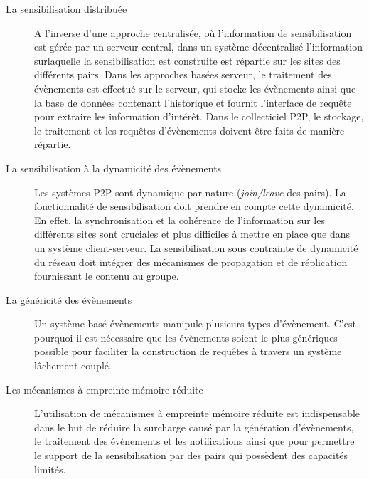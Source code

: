 \begin{description}
	\item[La sensibilisation distribuée] A l'inverse d'une approche centralisée, où 
	l'information de sensibilisation est gérée par un serveur central, dans un 
	système décentralisé l'information surlaquelle la sensibilisation est construite 
	est répartie sur les sites des différents pairs. Dans les approches basées 
	serveur, le traitement des évènements est effectué sur le serveur, qui stocke 
	les évènements ainsi que la base de données contenant l'historique et fournit 
	l'interface de requête pour extraire les information d'intérêt. Dans le collecticiel 
	P2P, le stockage, le traitement et les requêtes d'évènements doivent être faits 
	de manière répartie.
	
	\item[La sensibilisation à la dynamicité des évènements] Les systèmes P2P 
	sont dynamique par nature (\textit{join/leave} des pairs). La fonctionnalité de 
	sensibilisation doit prendre en compte cette dynamicité. En effet, la 
	synchronisation et la cohérence de l'information sur les différents sites sont 
	cruciales et plus difficiles à mettre en place que dans un système 
	client-serveur. La sensibilisation sous contrainte de dynamicité du réseau doit 
	intégrer des mécanismes de propagation et de réplication fournissant le contenu 
	au groupe. 
	
	\item[La généricité des évènements] Un système basé évènements manipule 
	plusieurs types d'évènement. C'est pourquoi il est nécessaire que les 
	évènements soient le plus génériques possible pour faciliter la construction de 
	requêtes à travers un système lâchement couplé.
	
	\item[Les mécanismes à empreinte mémoire réduite] L'utilisation de 
	mécanismes à empreinte mémoire réduite est indispensable dans le but de 
	réduire la surcharge causé par la génération d'évènements, le traitement des 
	évènements et les notifications ainsi que pour permettre le support de la 
	sensibilisation par des pairs qui possèdent des capacités limités.

\end{description}
